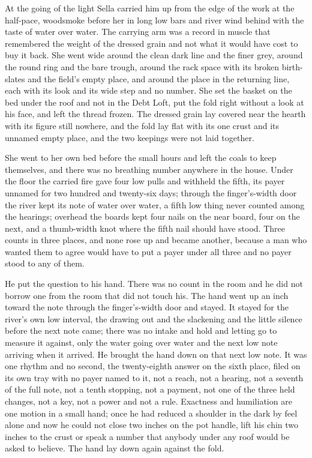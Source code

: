 At the going of the light Sella carried him up from the edge of the work at the half-pace, woodsmoke before her in long low bars and river wind behind with the taste of water over water. The carrying arm was a record in muscle that remembered the weight of the dressed grain and not what it would have cost to buy it back. She went wide around the clean dark line and the finer grey, around the round ring and the bare trough, around the rack space with its broken birth-slates and the field's empty place, and around the place in the returning line, each with its look and its wide step and no number. She set the basket on the bed under the roof and not in the Debt Loft, put the fold right without a look at his face, and left the thread frozen. The dressed grain lay covered near the hearth with its figure still nowhere, and the fold lay flat with its one crust and its unnamed empty place, and the two keepings were not laid together.

She went to her own bed before the small hours and left the coals to keep themselves, and there was no breathing number anywhere in the house. Under the floor the carried fire gave four low pulls and withheld the fifth, its payer unnamed for two hundred and twenty-six days; through the finger's-width door the river kept its note of water over water, a fifth low thing never counted among the hearings; overhead the boards kept four nails on the near board, four on the next, and a thumb-width knot where the fifth nail should have stood. Three counts in three places, and none rose up and became another, because a man who wanted them to agree would have to put a payer under all three and no payer stood to any of them.

He put the question to his hand. There was no count in the room and he did not borrow one from the room that did not touch his. The hand went up an inch toward the note through the finger's-width door and stayed. It stayed for the river's own low interval, the drawing out and the slackening and the little silence before the next note came; there was no intake and hold and letting go to measure it against, only the water going over water and the next low note arriving when it arrived. He brought the hand down on that next low note. It was one rhythm and no second, the twenty-eighth answer on the sixth place, filed on its own tray with no payer named to it, not a reach, not a hearing, not a seventh of the full note, not a tenth stopping, not a payment, not one of the three held changes, not a key, not a power and not a rule. Exactness and humiliation are one motion in a small hand; once he had reduced a shoulder in the dark by feel alone and now he could not close two inches on the pot handle, lift his chin two inches to the crust or speak a number that anybody under any roof would be asked to believe. The hand lay down again against the fold.

